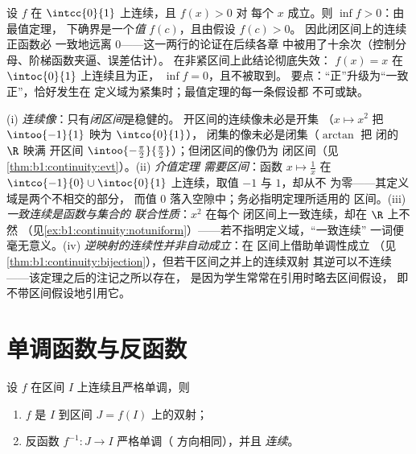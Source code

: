\begin{example}[闭区间上的正下界]\label{ex:b1:continuity:posmin}
设 $f$ 在 $\intcc{0}{1}$ 上连续，且 $f(x) > 0$ 对
每个 $x$ 成立。则 $\inf f > 0$：由最值定理，
下确界是一个\emph{值} $f(c)$，且由假设 $f(c) > 0$。
因此闭区间上的连续正函数必
一致地远离 $0$——这一两行的论证在后续各章
中被用了十余次（控制分母、阶梯函数夹逼、误差估计）。
在非紧区间上此结论彻底失效：
$f(x) = x$ 在 $\intoc{0}{1}$ 上连续且为正，
$\inf f = 0$，且不被取到。
要点：“正”升级为“一致正”，恰好发生在
定义域为紧集时；最值定理的每一条假设都
不可或缺。
\end{example}

\begin{remark}[三个定理的常见误区]
(i) \emph{连续像}：只有\emph{闭区间}是稳健的。
开区间的连续像未必是开集
（$x \mapsto x^2$ 把 $\intoo{-1}{1}$ 映为 $\intco{0}{1}$），
闭集的像未必是闭集（$\arctan$ 把
闭的 $\R$ 映满
开区间 $\intoo{-\frac\pi2}{\frac\pi2}$）；但闭区间的像仍为
闭区间（见\cref{thm:b1:continuity:evt}）。(ii) \emph{介值定理
需要区间}：函数 $x
\mapsto \frac1x$ 在 $\intco{-1}{0} \cup
\intoc{0}{1}$ 上连续，取值 $-1$ 与 $1$，却从不
为零——其定义域是两个不相交的部分，
而值 $0$ 落入空隙中；务必指明定理所适用的
区间。(iii) \emph{一致连续是函数与集合的
联合性质}：$x^2$ 在每个
闭区间上一致连续，却在 $\R$ 上不然
（见\cref{ex:b1:continuity:notuniform}）——若不指明定义域，“一致连续”
一词便毫无意义。(iv)
\emph{逆映射的连续性并非自动成立}：在
区间上借助单调性成立
（见\cref{thm:b1:continuity:bijection}），但若干区间之并上的连续双射
其逆可以不连续——该定理之后的注记之所以存在，
是因为学生常常在引用时略去区间假设，
即不带区间假设地引用它。
\end{remark}

\section{单调函数与反函数}

\begin{theorem}[单调双射定理]\label{thm:b1:continuity:bijection}
设 $f$ 在区间 $I$ 上连续且严格单调，则
\begin{enumerate}
  \item $f$ 是 $I$ 到区间 $J = f(I)$ 上的双射；
  \item 反函数 $f^{-1} \colon J \to I$ 严格单调（
        方向相同），并且 \emph{连续}。
\end{enumerate}
\end{theorem}

